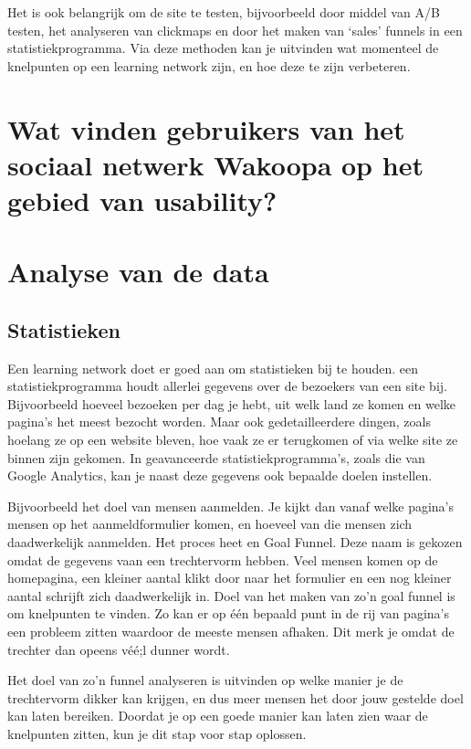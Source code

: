 \documentclass[a4paper, 10pt, pdftex]{report}
\begin{document}
    Het is ook belangrijk om de site te testen, bijvoorbeeld door middel van A/B testen, het analyseren van clickmaps en door het maken van `sales' funnels in een statistiekprogramma. Via deze methoden kan je uitvinden wat momenteel de knelpunten op een learning network zijn, en hoe deze te zijn verbeteren.


  \newpage
  \chapter{Wat vinden gebruikers van het sociaal netwerk Wakoopa op het gebied van usability?}
    \label{userchapter}
    \newpage

  \newpage
  \chapter{Analyse van de data}
    \label{datachapter}
    \newpage
    \section{Statistieken}
    Een learning network doet er goed aan om statistieken bij te houden. een statistiekprogramma houdt allerlei gegevens over de bezoekers van een site bij. Bijvoorbeeld hoeveel bezoeken per dag je hebt, uit welk land ze komen en welke pagina's het meest bezocht worden. Maar ook gedetailleerdere dingen, zoals hoelang ze op een website bleven, hoe vaak ze er terugkomen of via welke site ze binnen zijn gekomen. In geavanceerde statistiekprogramma's, zoals die van Google Analytics, kan je naast deze gegevens ook bepaalde doelen instellen.

    Bijvoorbeeld het doel van mensen aanmelden. Je kijkt dan vanaf welke pagina's mensen op het aanmeldformulier komen, en hoeveel van die mensen zich daadwerkelijk aanmelden. Het proces heet en Goal Funnel. Deze naam is gekozen omdat de gegevens vaan een trechtervorm hebben. Veel mensen komen op de homepagina, een kleiner aantal klikt door naar het formulier en een nog kleiner aantal schrijft zich daadwerkelijk in. Doel van het maken van zo'n goal funnel is om knelpunten te vinden. Zo kan er op \'e\'en bepaald punt in de rij van pagina's een probleem zitten waardoor de meeste mensen afhaken. Dit merk je omdat de trechter dan opeens v\'e\'e;l dunner wordt.

    Het doel van zo'n funnel analyseren is uitvinden op welke manier je de trechtervorm dikker kan krijgen, en dus meer mensen het door jouw gestelde doel kan laten bereiken. Doordat je op een goede manier kan laten zien waar de knelpunten zitten, kun je dit stap voor stap oplossen.
\end{document}
